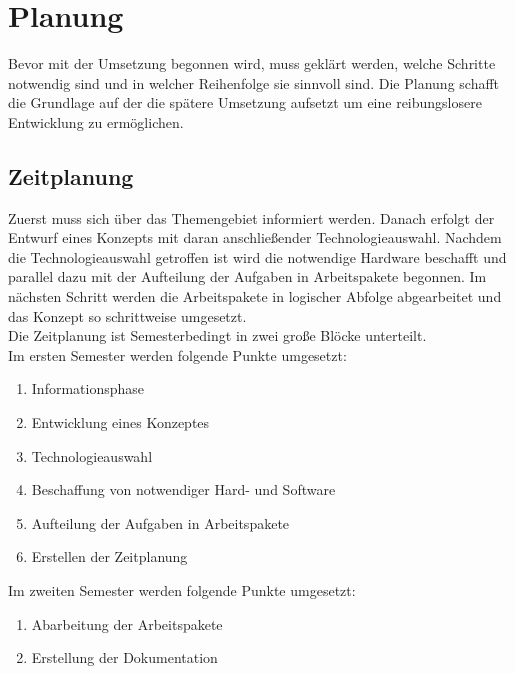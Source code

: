 \chapter{Planung}\label{Planung}
Bevor mit der Umsetzung begonnen wird, muss geklärt werden, welche Schritte notwendig sind und in welcher Reihenfolge sie sinnvoll sind. Die Planung schafft die Grundlage auf der die spätere Umsetzung aufsetzt um eine reibungslosere Entwicklung zu ermöglichen.

\section{Zeitplanung}\label{Zeitplanung}
Zuerst muss sich über das Themengebiet informiert werden. Danach erfolgt der
Entwurf eines Konzepts mit daran anschließender Technologieauswahl. Nachdem die
Technologieauswahl getroffen ist wird die notwendige Hardware beschafft und
parallel dazu mit der Aufteilung der Aufgaben in Arbeitspakete begonnen. Im
nächsten Schritt werden die Arbeitspakete in logischer Abfolge abgearbeitet und
das Konzept so schrittweise umgesetzt.\\
Die Zeitplanung ist Semesterbedingt in zwei große Blöcke unterteilt.\\
Im ersten Semester werden folgende Punkte umgesetzt:

\begin{enumerate}
	\item Informationsphase
	\item Entwicklung eines Konzeptes
	\item Technologieauswahl
	\item Beschaffung von notwendiger Hard- und Software
	\item Aufteilung der Aufgaben in Arbeitspakete
	\item Erstellen der Zeitplanung
\end{enumerate}

Im zweiten Semester werden folgende Punkte umgesetzt:

\begin{enumerate}
	\item Abarbeitung der Arbeitspakete
	\item Erstellung der Dokumentation
\end{enumerate}
